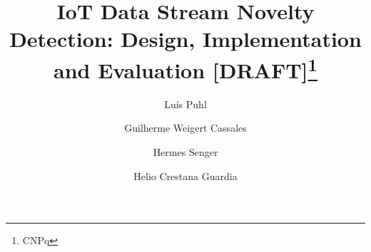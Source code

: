 \documentclass[runningheads]{lib/llncs}
\begin{document}
\title{IoT Data Stream Novelty Detection:
Design, Implementation and Evaluation [DRAFT]\thanks{CNPq}}

\author{
  Luís Puhl \and
  Guilherme Weigert Cassales \and
  Hermes Senger \and
  Helio Crestana Guardia
}

\maketitle










\end{document}
